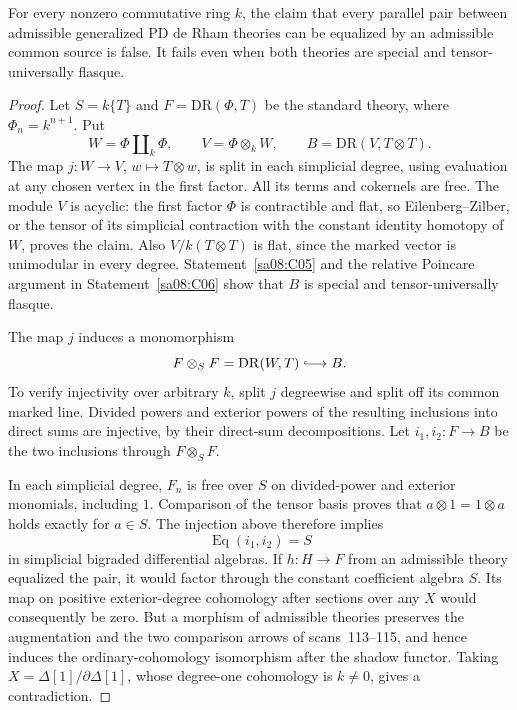 \begin{theorem}\label{sa08:C07}
For every nonzero commutative ring $k$, the claim that every parallel
pair between admissible generalized PD de Rham theories can be
equalized by an admissible common source is false. It fails even
when both theories are special and tensor-universally flasque.
\end{theorem}
\begin{proof}
Let $S=k\{T\}$ and $F=\mathrm{DR}(\Phi,T)$ be the standard theory,
where $\Phi_n=k^{n+1}$. Put
\[
 W=\Phi\amalg_k\Phi,\qquad V=\Phi\otimes_k W,
 \qquad B=\mathrm{DR}(V,T\otimes T).
\]
The map $j:W\to V$, $w\mapsto T\otimes w$, is split in each
simplicial degree, using evaluation at any chosen vertex in the first
factor. All its terms and cokernels are free. The module $V$ is
acyclic: the first factor $\Phi$ is contractible and flat, so
Eilenberg--Zilber, or the tensor of its simplicial contraction with
the constant identity homotopy of $W$, proves the claim. Also
$V/k(T\otimes T)$ is flat, since the marked vector is unimodular
in every degree. Statement~\ref{sa08:C05} and the relative
Poincare argument in Statement~\ref{sa08:C06} show that $B$ is
special and tensor-universally flasque.

The map $j$ induces a monomorphism
\[
 F\otimes_S F=\mathrm{DR}(W,T)\lhook\joinrel\longrightarrow B.
\]
To verify injectivity over arbitrary $k$, split $j$ degreewise and
split off its common marked line. Divided powers and exterior
powers of the resulting inclusions into direct sums are injective,
by their direct-sum decompositions. Let $i_1,i_2:F\to B$ be the
two inclusions through $F\otimes_S F$.

In each simplicial degree, $F_n$ is free over $S$ on divided-power
and exterior monomials, including $1$. Comparison of the tensor
basis proves that $a\otimes1=1\otimes a$ holds exactly for $a\in S$.
The injection above therefore implies
\[
 \operatorname{Eq}(i_1,i_2)=S
\]
in simplicial bigraded differential algebras. If $h:H\to F$ from
an admissible theory equalized the pair, it would factor through the
constant coefficient algebra $S$. Its map on positive exterior-degree
cohomology after sections over any $X$ would consequently be zero.
But a morphism of admissible theories preserves the augmentation
and the two comparison arrows of scans~113--115, and hence induces
the ordinary-cohomology isomorphism after the shadow functor.
Taking $X=\Delta[1]/\partial\Delta[1]$, whose degree-one cohomology
is $k\ne0$, gives a contradiction.
\end{proof}

